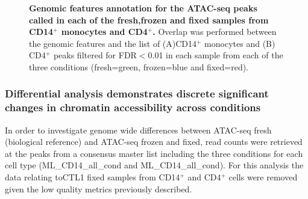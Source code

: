 \begin{figure}[htbp]
\begin{subfigure}{0.5\textwidth}
\caption{\textbf{}}
\end{subfigure}
\caption[Genomic features annotation for the ATAC-seq peaks called in each of the fresh,frozen and fixed samples from CD14$^+$ monocytes and total CD4$^+$.]{\textbf{Genomic features annotation for the ATAC-seq peaks called in each of the fresh,frozen and fixed samples from CD14$^+$ monocytes and CD4$^+$.} Overlap was performed between the genomic features and the list of (A)CD14$^+$ monocytes and (B) CD4$^+$ peaks filtered for FDR$<$0.01 in each sample from each of the three conditions (fresh=green, frozen=blue and fixed=red).}
\label{figure:Core_ATAC_all_conditions_genomic_features}
\end{figure} 


\subsubsection{Differential analysis demonstrates discrete significant changes in chromatin accessibility across conditions}
In order to investigate genome wide differences between ATAC-seq fresh (biological reference) and ATAC-seq frozen and fixed, read counts were retrieved at the peaks from a consensus master list including the three conditions for each cell type (ML\_CD14\_all\_cond and ML\_CD14\_all\_cond). For this analysis the data relating toCTL1 fixed samples from CD14$^+$ and CD4$^+$ cells were removed given the low quality metrics previously described. 
     

